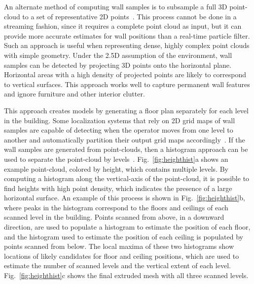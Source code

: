 \documentclass[10pt,twocolumn,twoside]{IEEEtran}
\begin{document}
An alternate method of computing wall samples is to subsample a full 3D point-cloud to a set of representative 2D points~\cite{Turner14,Eigencrust,Okorn09}.  This process cannot be done in a streaming fashion, since it requires a complete point cloud as input, but it can provide more accurate estimates for wall positions than a real-time particle filter.  Such an approach is useful when representing dense, highly complex point clouds with simple geometry.  Under the 2.5D assumption of the environment, wall samples can be detected by projecting 3D points onto the horizontal plane.  Horizontal areas with a high density of projected points are likely to correspond to vertical surfaces.  This approach works well to capture permanent wall features and ignore furniture and other interior clutter.

This approach creates models by generating a floor plan separately for each level in the building.  Some localization systems that rely on 2D grid maps of wall samples are capable of detecting when the operator moves from one level to another and automatically partition their output grid maps accordingly~\cite{MITBackpack}.  If the wall samples are generated from point-clouds, then a histogram approach can be used to separate the point-cloud by levels~\cite{Eigencrust}. Fig.~\ref{fig:heighthist}a shows an example point-cloud, colored by height, which contains multiple levels.  By computing a histogram along the vertical-axis of the point-cloud, it is possible to find heights with high point density, which indicates the presence of a large horizontal surface.  An example of this process is shown in Fig.~\ref{fig:heighthist}b, where peaks in the histogram correspond to the floors and ceilings of each scanned level in the building.  Points scanned from above, in a downward direction, are used to populate a histogram to estimate the position of each floor, and the histogram used to estimate the position of each ceiling is populated by points scanned from below.  The local maxima of these two histograms show locations of likely candidates for floor and ceiling positions, which are used to estimate the number of scanned levels and the vertical extent of each level.  Fig.~\ref{fig:heighthist}c shows the final extruded mesh with all three scanned levels.
\end{document}
